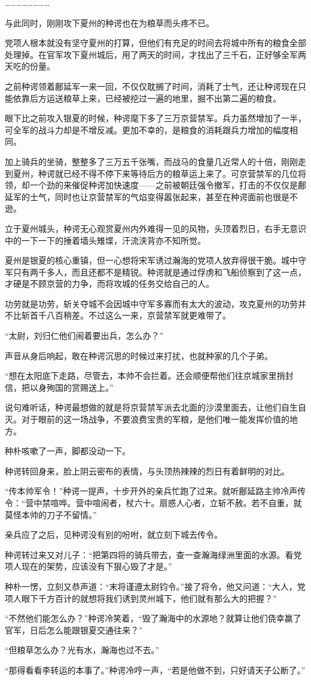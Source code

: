 ……………………

与此同时，刚刚攻下夏州的种谔也在为粮草而头疼不已。

党项人根本就没有坚守夏州的打算，但他们有充足的时间去将城中所有的粮食全部处理掉。在官军攻下夏州城后，用了两天的时间，才找出了三千石，正好够全军两天吃的份量。

之前种谔领着鄜延军一来一回，不仅仅耽搁了时间，消耗了士气，还让种谔现在只能依靠后方运送粮草上来，已经被挖过一遍的地里，掘不出第二遍的粮食。

眼下比之前攻入银夏的时候，种谔麾下多了三万京营禁军。兵力虽然增加了一半，可全军的战斗力却是不增反减。更加不幸的，是粮食的消耗跟兵力增加的幅度相同。

加上骑兵的坐骑，整整多了三万五千张嘴，而战马的食量几近常人的十倍，刚刚走到夏州，种谔就已经不得不停下来等待后方的粮草运上来了。可京营禁军的几位将领，却一个劲的来催促种谔加快速度——之前被朝廷强令撤军，打击的不仅仅是鄜延军的士气，同时也让京营禁军的气焰变得嚣张起来，甚至在种谔面前也很是不逊。

立于夏州城头，种谔无心观赏夏州内外难得一见的风物，头顶着烈日，右手无意识中的一下一下的捶着墙头雉堞，汗流浃背亦不知所觉。

夏州是银夏的核心重镇，但一心想将宋军诱过瀚海的党项人放弃得很干脆。城中守军只有两千多人，而且还都不是精锐。种谔就是通过俘虏和飞船侦察到了这一点，才硬是不顾京营的力争，而将攻城的任务交给自己的人。

功劳就是功劳，斩关夺城不会因城中守军多寡而有太大的波动，攻克夏州的功劳并不比斩首千八百稍差。不过这么一来，京营禁军就更难带了。

“太尉，刘归仁他们闹着要出兵，怎么办？”

声音从身后响起，敢在种谔沉思的时候过来打扰，也就种家的几个子弟。

“想在太阳底下走路，尽管去，本帅不会拦着。还会顺便帮他们往京城家里捎封信，把以身殉国的赏赐送上。”

说句难听话，种谔最想做的就是将京营禁军派去北面的沙漠里面去，让他们自生自灭。对于眼前的这一场战争，不要浪费宝贵的军粮，是他们唯一能发挥价值的地方。

种朴咳嗽了一声，脚都没动一下。

种谔转回身来，脸上阴云密布的表情，与头顶热辣辣的烈日有着鲜明的对比。

“传本帅军令！”种谔一提声，十步开外的亲兵忙跑了过来。就听鄜延路主帅冷声传令：“营中禁喧哗。营中喧闹者，杖六十。扇惑人心者，立斩不赦。若不自重，就莫怪本帅的刀子不留情。”

亲兵应了之后，见种谔没有别的吩咐，就立刻下城去传令。

种谔转过来又对儿子：“把第四将的骑兵带去，查一查瀚海绿洲里面的水源。看党项人现在的架势，应该没有下狠心毁了才是。”

种朴一愣，立刻又恭声道：“末将谨遵太尉钧令。”接了将令，他又问道：“大人，党项人眼下千方百计的就想将我们诱到灵州城下，他们就有那么大的把握？”

“不然他们能怎么办？”种谔冷笑着，“毁了瀚海中的水源地？就算让他们侥幸赢了官军，日后怎么能跟银夏交通往来？”

“但粮草怎么办？光有水，瀚海也过不去。”

“那得看看李转运的本事了。”种谔冷哼一声，“若是他做不到，只好请天子公断了。”

